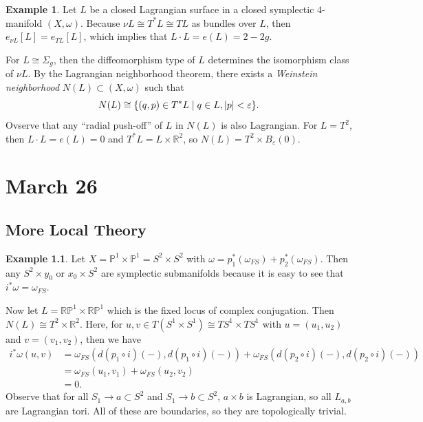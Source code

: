 \documentclass[leqno, openany]{memoir}
\theoremstyle{definition}
\newtheorem{exm}[thm]{Example}
\theoremstyle{remark}
\theoremstyle{plain}
\theoremstyle{definition}
\theoremstyle{remark}
\newcommand{\R}{\mathbb{R}}
\renewcommand{\P}{\mathbb{P}}
\newcommand{\ep}{\varepsilon}
\begin{document}
    \begin{exm}
        Let $L$ be a closed Lagrangian surface in a closed symplectic $4$-manifold $(X, \omega)$. Because $\nu L \cong T^*L \cong TL$ as bundles over $L$, then $e_{\nu L} [L] = e_{TL}[L]$, which implies that $L \cdot L = e(L) = 2 - 2g$.

        For $L \cong \Sigma_g$, then the diffeomorphism type of $L$ determines the isomorphism class of $\nu L$. By the Lagrangian neighborhood theorem, there exists a \textit{Weinstein neighborhood} $N(L) \subset (X, \omega)$ such that 
        \[ N(L) \cong \{ (q,p) \in T^* L \mid q \in L, \abs{p} < \ep \}. \]
        Ovserve that any ``radial push-off'' of $L$ in $N(L)$ is also Lagrangian. For $L = T^2$, then $L \cdot L = e(L) = 0$ and $T^*L = L \times \R^2$, so $N(L) = T^2 \times B_{\ep}(0)$.
    \end{exm}

    \chapter{March 26}%
    \label{cha:march_26}

    \section{More Local Theory}%
    \label{sec:more_local_theory}
    
    \begin{exm}
        Let $X = \P^1 \times \P^1 = S^2 \times S^2$ with $\omega = p_1^* (\omega_{FS}) + p_2^*(\omega_{FS})$. Then any $S^2 \times y_0$ or $x_0 \times S^2$ are symplectic submanifolds because it is easy to see that $i^* \omega = \omega_{FS}$.

        Now let $L = \R\P^1 \times \R\P^1$ which is the fixed locus of complex conjugation. Then $N(L) \cong T^2 \times \R^2$. Here, for $u,v \in T(S^1 \times S^1) \cong TS^1 \times TS^1$ with $u = (u_1, u_2)$ and $v = (v_1, v_2)$, then we have
        \begin{align*}
            i^* \omega(u,v) &= \omega_{FS}(d(p_1 \circ i)(-), d(p_1 \circ i)(-)) + \omega_{FS}(d(p_2 \circ i)(-), d(p_2 \circ i)(-)) \\
                            &= \omega_{FS}(u_1, v_1) + \omega_{FS}(u_2, v_2) \\
                            &= 0.
        \end{align*}
        Observe that for all $S_1 \to a \subset S^2$ and $S_1 \to b \subset S^2$, $a \times b$ is Lagrangian, so all $L_{a,b}$ are Lagrangian tori. All of these are boundaries, so they are topologically trivial.
    \end{exm}
\end{document}
